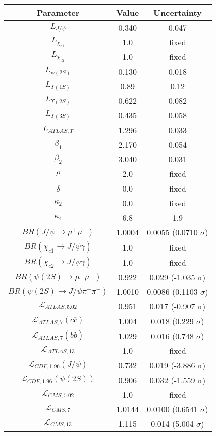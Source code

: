 \begin{table}[h!]
\centering
\begin{tabular}{c|c|c}
Parameter & Value & Uncertainty \\
\hline
$L_{J/\psi}$ & 0.340 & 0.047 \\
$L_{\chi_{c1}}$ & 1.0 & fixed \\
$L_{\chi_{c2}}$ & 1.0 & fixed \\
$L_{\psi(2S)}$ & 0.130 & 0.018 \\
$L_{\Upsilon(1S)}$ & 0.89 & 0.12 \\
$L_{\Upsilon(2S)}$ & 0.622 & 0.082 \\
$L_{\Upsilon(3S)}$ & 0.435 & 0.058 \\
$L_{ATLAS,\Upsilon}$ & 1.296 & 0.033 \\
$\beta_1$ & 2.170 & 0.054 \\
$\beta_2$ & 3.040 & 0.031 \\
$\rho$ & 2.0 & fixed \\
$\delta$ & 0.0 & fixed \\
$\kappa_2$ & 0.0 & fixed \\
$\kappa_4$ & 6.8 & 1.9 \\
$BR(J/\psi\rightarrow\mu^+\mu^-)$ & 1.0004 & 0.0055 (0.0710 $\sigma$) \\
$BR(\chi_{c1}\rightarrow J/\psi\gamma)$ & 1.0 & fixed \\
$BR(\chi_{c2}\rightarrow J/\psi\gamma)$ & 1.0 & fixed \\
$BR(\psi(2S)\rightarrow\mu^+\mu^-)$ & 0.922 & 0.029 (-1.035 $\sigma$) \\
$BR(\psi(2S)\rightarrow J/\psi\pi^+\pi^-)$ & 1.0010 & 0.0086 (0.1103 $\sigma$) \\
$\mathcal L_{ATLAS,5.02}$ & 0.951 & 0.017 (-0.907 $\sigma$) \\
$\mathcal L_{ATLAS,7}(c\overline c)$ & 1.004 & 0.018 (0.229 $\sigma$) \\
$\mathcal L_{ATLAS,7}(b\overline b)$ & 1.029 & 0.016 (0.748 $\sigma$) \\
$\mathcal L_{ATLAS,13}$ & 1.0 & fixed \\
$\mathcal L_{CDF,1.96}(J/\psi)$ & 0.732 & 0.019 (-3.886 $\sigma$) \\
$\mathcal L_{CDF,1.96}(\psi(2S))$ & 0.906 & 0.032 (-1.559 $\sigma$) \\
$\mathcal L_{CMS,5.02}$ & 1.0 & fixed \\
$\mathcal L_{CMS,7}$ & 1.0144 & 0.0100 (0.6541 $\sigma$) \\
$\mathcal L_{CMS,13}$ & 1.115 & 0.014 (5.004 $\sigma$) \\

\end{tabular}
\end{table}
